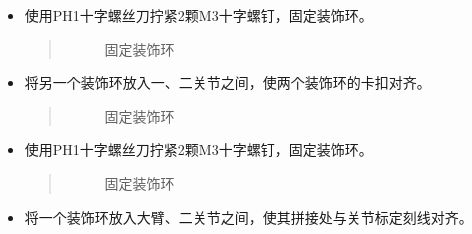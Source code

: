 \documentclass[a4paper,11pt,english,openany,oneside]{sphinxmanual}
\begin{document}
\begin{itemize}
\begin{itemize}
\begin{quote}
\begin{figure}[H]
\centering
\capstart

\noindent{}
\caption{固定装饰环}\label{\detokenize{_u66f4_u6362_u5173_u8282:id144}}\end{figure}
\end{quote}

\item {} 
\sphinxAtStartPar
使用PH1十字螺丝刀拧紧2颗M3十字螺钉，固定装饰环。
\begin{quote}

\begin{figure}[H]
\centering
\capstart

\noindent{}
\caption{固定装饰环}\label{\detokenize{_u66f4_u6362_u5173_u8282:id145}}\end{figure}
\end{quote}

\item {} 
\sphinxAtStartPar
将另一个装饰环放入一、二关节之间，使两个装饰环的卡扣对齐。
\begin{quote}

\begin{figure}[H]
\centering
\capstart

\noindent{}
\caption{固定装饰环}\label{\detokenize{_u66f4_u6362_u5173_u8282:id146}}\end{figure}
\end{quote}

\item {} 
\sphinxAtStartPar
使用PH1十字螺丝刀拧紧2颗M3十字螺钉，固定装饰环。
\begin{quote}

\begin{figure}[H]
\centering
\capstart

\noindent{}
\caption{固定装饰环}\label{\detokenize{_u66f4_u6362_u5173_u8282:id147}}\end{figure}
\end{quote}

\item {} 
\sphinxAtStartPar
将一个装饰环放入大臂、二关节之间，使其拼接处与关节标定刻线对齐。
\begin{quote}

\begin{figure}[H]
\centering
\capstart


\end{figure}
\end{quote}
\end{itemize}
\end{itemize}
\end{document}
